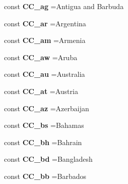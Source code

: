 \begin{DoxyCompactItemize}
const {\bfseries C\+C\+\_\+ag} =\textquotesingle{}Antigua and Barbuda\textquotesingle{}
\item 
\hypertarget{class_i_s_o_abb102cc6e2b6471d3b0dff1700798a73}{}\label{class_i_s_o_abb102cc6e2b6471d3b0dff1700798a73} 
const {\bfseries C\+C\+\_\+ar} =\textquotesingle{}Argentina\textquotesingle{}
\item 
\hypertarget{class_i_s_o_a3d334d544ffb9fad3b09fc2ee8c4643a}{}\label{class_i_s_o_a3d334d544ffb9fad3b09fc2ee8c4643a} 
const {\bfseries C\+C\+\_\+am} =\textquotesingle{}Armenia\textquotesingle{}
\item 
\hypertarget{class_i_s_o_afd4252c9381c37e569417b764021fcae}{}\label{class_i_s_o_afd4252c9381c37e569417b764021fcae} 
const {\bfseries C\+C\+\_\+aw} =\textquotesingle{}Aruba\textquotesingle{}
\item 
\hypertarget{class_i_s_o_a68e88bbdbd60df04ed5d61b21fc914e0}{}\label{class_i_s_o_a68e88bbdbd60df04ed5d61b21fc914e0} 
const {\bfseries C\+C\+\_\+au} =\textquotesingle{}Australia\textquotesingle{}
\item 
\hypertarget{class_i_s_o_a55a9f9dd8c9db9f627b44ae2b51d4bbe}{}\label{class_i_s_o_a55a9f9dd8c9db9f627b44ae2b51d4bbe} 
const {\bfseries C\+C\+\_\+at} =\textquotesingle{}Austria\textquotesingle{}
\item 
\hypertarget{class_i_s_o_a0d74302b6664d7eef3063f135416e761}{}\label{class_i_s_o_a0d74302b6664d7eef3063f135416e761} 
const {\bfseries C\+C\+\_\+az} =\textquotesingle{}Azerbaijan\textquotesingle{}
\item 
\hypertarget{class_i_s_o_a14dd595f01bad4847a22d20daf7d0b59}{}\label{class_i_s_o_a14dd595f01bad4847a22d20daf7d0b59} 
const {\bfseries C\+C\+\_\+bs} =\textquotesingle{}Bahamas\textquotesingle{}
\item 
\hypertarget{class_i_s_o_a7b66f05bf64ff30e8df55f25770c070f}{}\label{class_i_s_o_a7b66f05bf64ff30e8df55f25770c070f} 
const {\bfseries C\+C\+\_\+bh} =\textquotesingle{}Bahrain\textquotesingle{}
\item 
\hypertarget{class_i_s_o_a7a161434d5d6b9f160f1229024a2a0ec}{}\label{class_i_s_o_a7a161434d5d6b9f160f1229024a2a0ec} 
const {\bfseries C\+C\+\_\+bd} =\textquotesingle{}Bangladesh\textquotesingle{}
\item 
\hypertarget{class_i_s_o_a309019f8c2b554d310a839cf28f8463d}{}\label{class_i_s_o_a309019f8c2b554d310a839cf28f8463d} 
const {\bfseries C\+C\+\_\+bb} =\textquotesingle{}Barbados\textquotesingle{}
\item 
\hypertarget{class_i_s_o_a2277e57130c66d4ccc0bcf0c3ca830a2}{}\label{class_i_s_o_a2277e57130c66d4ccc0bcf0c3ca830a2} 

\end{DoxyCompactItemize}
